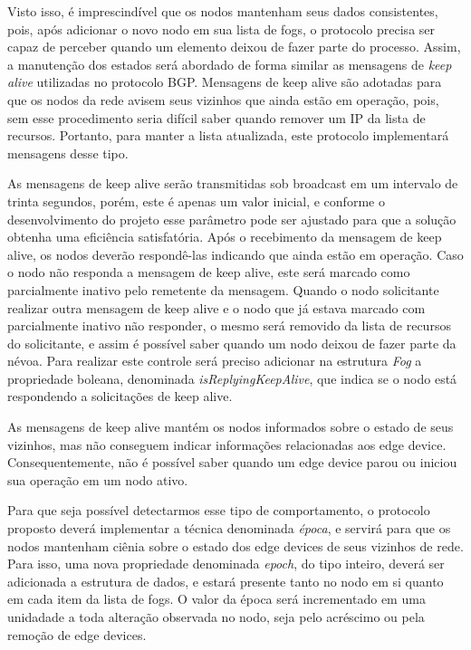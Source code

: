 Visto isso, é imprescindível que os nodos mantenham seus dados consistentes, pois, após adicionar o novo nodo em sua lista de fogs, o protocolo precisa ser capaz de perceber quando um elemento
deixou de fazer parte do processo. Assim, a manutenção dos estados será abordado de forma similar as mensagens de \textit{keep alive} utilizadas no protocolo BGP.
Mensagens de keep alive são adotadas para que os nodos da rede avisem seus vizinhos que ainda estão em operação, pois, sem esse procedimento seria difícil
saber quando remover um IP da lista de recursos. Portanto, para manter a lista atualizada, este protocolo implementará mensagens desse tipo.

As mensagens de keep alive serão transmitidas sob broadcast em um intervalo de trinta segundos, porém, este é apenas um valor inicial, e conforme o desenvolvimento do projeto esse
parâmetro pode ser ajustado para que a solução obtenha uma eficiência satisfatória.
Após o recebimento da mensagem de keep alive, os nodos deverão respondê-las indicando que ainda estão em operação.
Caso o nodo não responda a mensagem de keep alive, este será marcado como parcialmente inativo pelo remetente da mensagem.
Quando o nodo solicitante realizar outra mensagem de keep alive e o nodo que já estava marcado com parcialmente inativo não responder, o mesmo será removido da lista de recursos do
solicitante, e assim é possível saber quando um nodo deixou de fazer parte da névoa.
Para realizar este controle será preciso adicionar na estrutura \textit{Fog} a propriedade boleana, denominada \textit{isReplyingKeepAlive}, que indica se o nodo está respondendo a solicitações de keep alive.

As mensagens de keep alive mantém os nodos informados sobre o estado de seus vizinhos, mas não conseguem indicar informações relacionadas aos edge device.
Consequentemente, não é possível saber quando um edge device parou ou iniciou sua operação em um nodo ativo.

Para que seja possível detectarmos esse tipo de comportamento, o protocolo proposto deverá implementar a técnica denominada \textit{época},
e servirá para que os nodos mantenham ciênia sobre o estado dos edge devices de seus vizinhos de rede.
Para isso, uma nova propriedade denominada \textit{epoch}, do tipo inteiro, deverá ser adicionada a estrutura de dados, e estará presente tanto no nodo em si quanto em cada item da lista de fogs.
O valor da época será incrementado em uma unidadade a toda alteração observada no nodo, seja pelo acréscimo ou pela remoção de edge devices.

